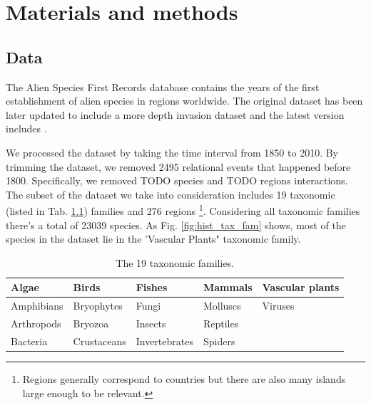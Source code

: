 \documentclass[mscthesis]{usiinfthesis}
\begin{document}
\chapter{Materials and methods}

\section{Data}

The Alien Species First Records database \cite{intro:dataset} contains the years of the first establishment of alien species in regions worldwide. The original dataset has been later updated to include a more depth invasion dataset \cite{intro:datasetv2} and the latest version includes  . 

We processed the dataset by taking the time interval from 1850 to 2010. By trimming the dataset, we removed 2495 relational events that happened before 1800. Specifically, we removed TODO species and TODO regions interactions. The subset of the dataset we take into consideration includes 19 taxonomic (listed in Tab. \ref{table:families}) families and 276 regions \footnote{Regions generally correspond to countries but there are also many islands large enough to be relevant.}. Considering all taxonomic families there's a total of 23039 species. As Fig. \ref{fig:hist_tax_fam} shows, most of the species in the dataset lie in the 'Vascular Plants" taxonomic family.

\begin{table}[H]
\centering
\begin{tabular}{|l|l|l|l|l|}
\hline
Algae      & Birds       & Fishes        & Mammals  & Vascular plants \\ \hline
Amphibians & Bryophytes  & Fungi         & Molluscs & Viruses         \\ \hline
Arthropods & Bryozoa     & Insects       & Reptiles &                 \\ \hline
Bacteria   & Crustaceans & Invertebrates & Spiders  &                 \\ \hline             
\end{tabular}
\caption{The 19 taxonomic families.}
\label{table:families}
\end{table}
\end{document}
